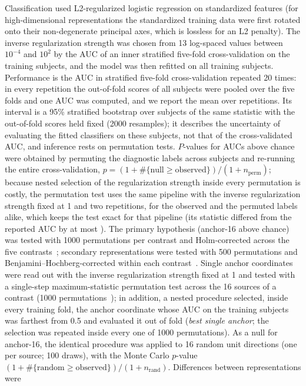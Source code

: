 \documentclass[10pt,letterpaper]{article}
\begin{document}
Classification used L2-regularized logistic regression on standardized features (for
high-dimensional representations the standardized training data were first rotated onto their
non-degenerate principal axes, which is lossless for an L2 penalty). The inverse regularization
strength was chosen from 13 log-spaced values between $10^{-4}$ and $10^{2}$ by the AUC of an
inner stratified five-fold cross-validation on the training subjects, and the model was then
refitted on all training subjects. Performance is the AUC in stratified five-fold cross-validation repeated 20 times: in every
repetition the out-of-fold scores of all subjects were pooled over the five folds and one AUC was
computed, and we report the mean over repetitions. Its interval is a 95\% stratified bootstrap
over subjects of the same statistic with the out-of-fold scores held fixed (2000 resamples); it
describes the uncertainty of evaluating the fitted classifiers on these subjects, not that of the
cross-validated AUC, and inference rests on permutation tests. $P$-values for AUCs above chance were obtained by
permuting the diagnostic labels across subjects and re-running the entire cross-validation,
$p=(1+\#\{\text{null}\geq\text{observed}\})/(1+n_{\text{perm}})$; because nested selection of the
regularization strength inside every permutation is costly, the permutation test uses the same
pipeline with the inverse regularization strength fixed at 1 and two repetitions, for the observed
and the permuted labels alike, which keeps the test exact for that pipeline (its statistic differed
from the reported AUC by at most \PermStatMaxDiff). The primary hypothesis (anchor-16 above chance) was tested
with 1000 permutations per contrast and Holm-corrected across the five contrasts~\cite{holm1979simple}; secondary representations were tested with 500 permutations and
Benjamini--Hochberg-corrected within each contrast~\cite{benjamini1995fdr}. Single anchor
coordinates were read out with the inverse regularization strength fixed at 1 and tested with a
single-step maximum-statistic permutation test across the 16 sources of a contrast
(1000 permutations~\cite{westfall1993resampling}); in addition, a nested procedure selected,
inside every training fold, the anchor coordinate whose AUC on the training subjects was farthest
from 0.5 and evaluated it out of fold (\emph{best single anchor}; the selection was repeated inside
every one of 1000 permutations). As a null for anchor-16, the identical procedure was applied to
16 random unit directions (one per source; 100 draws), with the Monte Carlo $p$-value
$(1+\#\{\text{random}\geq\text{observed}\})/(1+n_{\text{rand}})$. Differences between representations were
\end{document}
